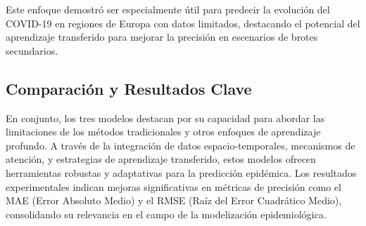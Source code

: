 Este enfoque demostró ser especialmente útil para predecir la evolución del COVID-19 en regiones de Europa con datos limitados, destacando el potencial del aprendizaje transferido para mejorar la precisión en escenarios de brotes secundarios.

\subsection{Comparación y Resultados Clave}

En conjunto, los tres modelos destacan por su capacidad para abordar las limitaciones de los métodos tradicionales y otros enfoques de aprendizaje profundo. A través de la integración de datos espacio-temporales, mecanismos de atención, y estrategias de aprendizaje transferido, estos modelos ofrecen herramientas robustas y adaptativas para la predicción epidémica. Los resultados experimentales indican mejoras significativas en métricas de precisión como el MAE (Error Absoluto Medio) y el RMSE (Raíz del Error Cuadrático Medio), consolidando su relevancia en el campo de la modelización epidemiológica.

